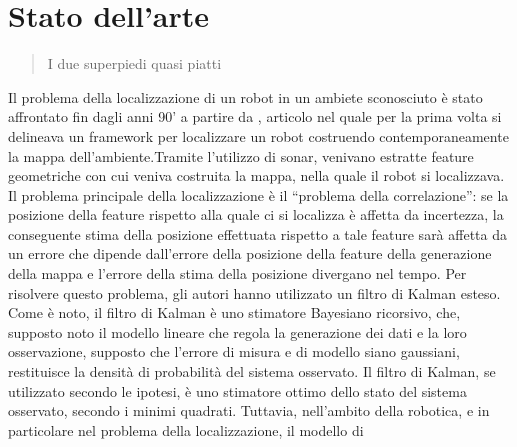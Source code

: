 \chapter{Stato dell'arte}
\label{capitolo2}
\thispagestyle{empty}

\begin{quotation}
{\footnotesize
{}
\begin{flushright}
I due superpiedi quasi piatti
\end{flushright}
}
\end{quotation}
\vspace{0.5cm}

Il problema della localizzazione di un robot in un ambiete sconosciuto è stato affrontato fin dagli anni 90' a partire da \cite{174711}, articolo nel quale per la prima volta si delineava un framework per localizzare un robot costruendo contemporaneamente la mappa dell'ambiente.Tramite l'utilizzo di sonar, venivano estratte feature geometriche con cui veniva costruita la mappa, nella quale il robot si localizzava. Il problema principale della localizzazione è il ``problema della correlazione'': se la posizione della feature rispetto alla quale ci si localizza è affetta da incertezza, la conseguente stima della posizione effettuata rispetto a tale feature sarà affetta da un errore che dipende dall'errore della posizione della feature %
della generazione della mappa e l'errore della stima della posizione divergano nel tempo. Per risolvere questo problema, gli autori hanno utilizzato un filtro di Kalman esteso.
Come è noto, il filtro di Kalman è uno stimatore Bayesiano ricorsivo, che, supposto noto il modello lineare che regola la generazione dei dati e la loro osservazione, supposto che l'errore di misura e di modello siano gaussiani, restituisce la densità di probabilità del sistema osservato. Il filtro di Kalman, se utilizzato secondo le ipotesi, è uno stimatore ottimo dello stato del sistema osservato, secondo i minimi quadrati.
Tuttavia, nell'ambito della robotica, e in particolare nel problema della localizzazione, il modello di %
